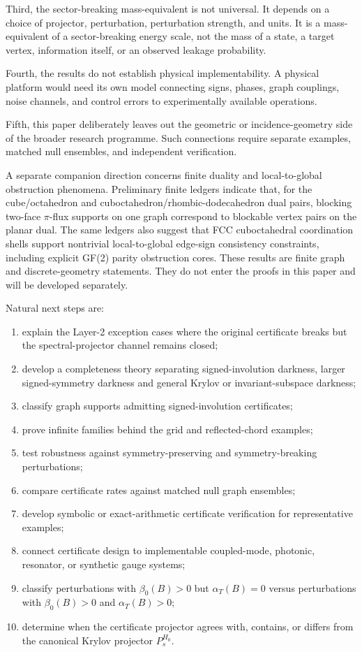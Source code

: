 \documentclass[11pt]{article}
\theoremstyle{definition}
\begin{document}
Third, the sector-breaking mass-equivalent is not universal. It depends on a choice of projector, perturbation, perturbation strength, and units. It is a mass-equivalent of a sector-breaking energy scale, not the mass of a state, a target vertex, information itself, or an observed leakage probability.

Fourth, the results do not establish physical implementability. A physical platform would need its own model connecting signs, phases, graph couplings, noise channels, and control errors to experimentally available operations.

Fifth, this paper deliberately leaves out the geometric or incidence-geometry side of the broader research programme. Such connections require separate examples, matched null ensembles, and independent verification.

A separate companion direction concerns finite duality and local-to-global obstruction phenomena. Preliminary finite ledgers indicate that, for the cube/octahedron and cuboctahedron/rhombic-dodecahedron dual pairs, blocking two-face $\pi$-flux supports on one graph correspond to blockable vertex pairs on the planar dual. The same ledgers also suggest that FCC cuboctahedral coordination shells support nontrivial local-to-global edge-sign consistency constraints, including explicit GF(2) parity obstruction cores. These results are finite graph and discrete-geometry statements. They do not enter the proofs in this paper and will be developed separately.

Natural next steps are:
\begin{enumerate}
\item explain the Layer-2 exception cases where the original certificate breaks but the spectral-projector channel remains closed;
\item develop a completeness theory separating signed-involution darkness, larger signed-symmetry darkness and general Krylov or invariant-subspace darkness;
\item classify graph supports admitting signed-involution certificates;
\item prove infinite families behind the grid and reflected-chord examples;
\item test robustness against symmetry-preserving and symmetry-breaking perturbations;
\item compare certificate rates against matched null graph ensembles;
\item develop symbolic or exact-arithmetic certificate verification for representative examples;
\item connect certificate design to implementable coupled-mode, photonic, resonator, or synthetic gauge systems;
\item classify perturbations with $\beta_0(B)>0$ but $\alpha_T(B)=0$ versus perturbations with $\beta_0(B)>0$ and $\alpha_T(B)>0$;
\item determine when the certificate projector agrees with, contains, or differs from the canonical Krylov projector $P_s^{H_0}$.
\end{enumerate}
\end{document}
